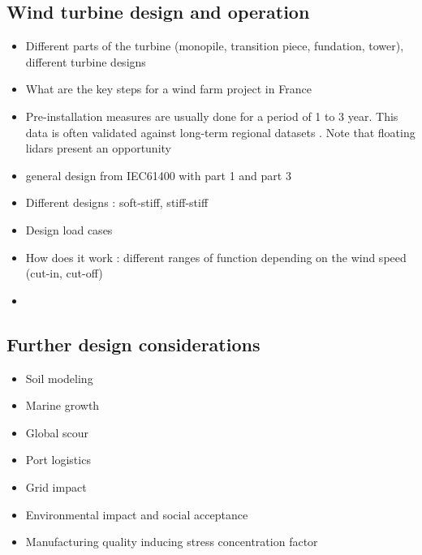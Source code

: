 \subsection{Wind turbine design and operation}
    \begin{itemize}
        \item Different parts of the turbine (monopile, transition piece, fundation, tower), different turbine designs
        \item What are the key steps for a wind farm project in France 
        \item Pre-installation measures are usually done for a period of 1 to 3 year. This data is often validated against long-term regional datasets \cite{sempreviva_2008_wind_assessment_review}. Note that floating lidars present an opportunity 
        \item general design from IEC61400 with part 1 and part 3
        \item Different designs : soft-stiff, stiff-stiff 
        \item Design load cases 
        \item How does it work : different ranges of function depending on the wind speed (cut-in, cut-off)
        \item 
    \end{itemize}

\subsection{Further design considerations}
\begin{itemize}
    \item Soil modeling
    \item Marine growth
    \item Global scour
    \item Port logistics
    \item Grid impact
    \item Environmental impact and social acceptance 
    \item Manufacturing quality inducing stress concentration factor
\end{itemize}



